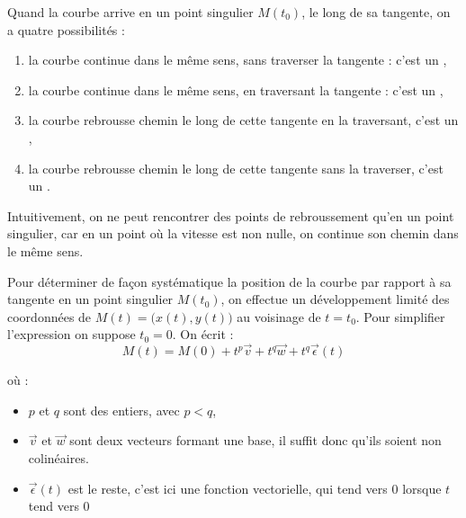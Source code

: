Quand la courbe arrive en un point singulier $M(t_0)$, le long de sa tangente, on a 
quatre possibilités :
\begin{enumerate}
  \item la courbe continue dans le même sens, 
  sans traverser la tangente :
  c'est un ,

  \change
  
  \item la courbe continue dans le même sens, en traversant la tangente :
  c'est un ,

  \change
  
  \item la courbe rebrousse chemin le long de 
cette tangente en la traversant, c'est un
,

  \change
  
  \item la courbe rebrousse chemin le long de 
cette tangente sans la traverser, c'est un
.
  
\end{enumerate}

Intuitivement, on ne peut rencontrer des points de rebroussement qu'en 
un point singulier, car en un point où la vitesse est non nulle, 
on continue son chemin dans le même sens.


\diapo
Pour déterminer de façon systématique la position 
de la courbe par rapport à sa tangente
en un point singulier $M(t_0)$, 
on effectue un développement limité des coordonnées 
de $M(t) = \big(x(t),y(t)\big)$ 
au voisinage de $t=t_0$.
Pour simplifier l'expression on suppose $t_0=0$.
On écrit : 
$$M(t) = M(0) + t^p \overrightarrow{v} + t^q \overrightarrow{w} +t^q \overrightarrow{\epsilon}(t)$$

\change
où :
\begin{itemize}
  \item $p$ et $q$ sont des entiers, avec $p<q$,
  
\change
  
  \item $\overrightarrow{v}$ et $\overrightarrow{w}$ sont deux vecteurs formant une base, il suffit donc qu'ils soient non colinéaires.
  
  \change
  \item $\overrightarrow{\epsilon}(t)$ est le reste, c'est ici une fonction 
  vectorielle, qui tend vers $0$ lorsque $t$ tend vers $0$
\end{itemize}

